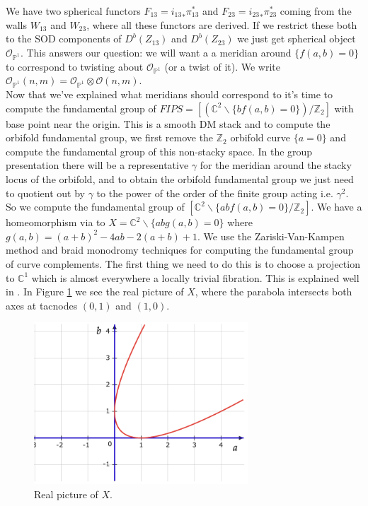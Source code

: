 \documentclass[oneside]{amsart}
\theoremstyle{definition}
\theoremstyle{definition}
\theoremstyle{definition}
\theoremstyle{definition}
\newcommand{\CC}{\mathbb{C}}
\newcommand{\PP}{\mathbb{P}}
\newcommand{\Z}{\mathbb{Z}}
\newcommand{\Os}{\mathcal{O}}
\begin{document}
We have two spherical functors $F_{13} = {i_{13}}_* \pi_{13}^*$ and $F_{23} = {i_{23}}_* \pi_{23}^*$ coming from the walls $W_{13}$ and $W_{23}$, where all these functors are derived. If we restrict these both to the SOD components of $D^b(Z_{13})$ and $D^b(Z_{23})$ we just get spherical object $\Os_{\PP^1}$. This answers our question:
we will want a a meridian around $\{ f(a,b)=0\}$ to correspond to twisting about $\Os_{\PP^1}$ (or a twist of it). We write $\mathcal{O}_{\PP^1}(n,m) = \mathcal{O}_{\PP^1}\otimes \mathcal{O} (n,m)$.
\\
\newline
Now that we've explained what meridians should correspond to it's time to compute the fundamental group of $FIPS=\left[ (\CC^2 \backslash \{bf(a,b)=0\} ) / \Z_2 \right]$ with base point near the origin. This is a smooth DM stack and to compute the orbifold  fundamental group, we first remove the $\Z_2$ orbifold curve $\{ a=0\}$ and compute the fundamental group of this non-stacky space. In the group presentation there will be a representative $\gamma$ for the meridian around the stacky locus of the orbifold, and to obtain the orbifold fundamental group we just need to quotient out by $\gamma$ to the power of the order of the finite group acting i.e. $\gamma^2$.\\
\newline
So we compute the fundamental group of $[\CC^2 \backslash \{abf(a,b)=0\}/\Z_2]$. We have a homeomorphism via to $X = \CC^2 \backslash \{abg(a,b)=0\}$ where $g(a,b)=(a + b )^2 -4ab -2(a + b) +1$. We use the Zariski-Van-Kampen method and braid monodromy techniques for computing the fundamental group of curve complements. The first thing we need to do this is to choose a projection to $\CC^1$ which is almost everywhere a locally trivial fibration. This is explained well in \cite{cogolludo}. In Figure \ref{FIPS1} we see the real picture of $X$, where the parabola intersects both axes at tacnodes $(0,1)$ and $(1,0)$.
\begin{figure}[!h]
    \centering
    \includegraphics[width=8cm]{rank2exmp/FIPS1.png}
    \caption{Real picture of $X$.}
    \label{FIPS1}
\end{figure}
\end{document}

